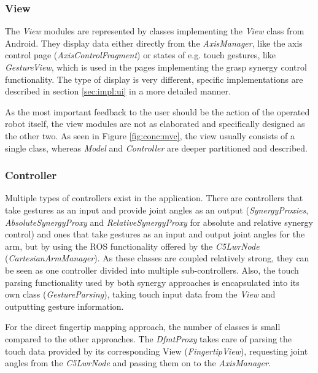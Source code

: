 \subsubsection{View}

The \textit{View} modules are represented by classes implementing the \textit{View} class from Android. They display data either directly from the \textit{AxisManager}, like the axis control page (\textit{AxisControlFragment}) or states of e.g. touch gestures, like \textit{GestureView}, which is used in the pages implementing the grasp synergy control functionality. The type of display is very different, specific implementations are described in section \ref{sec:impl:ui} in a more detailed manner.

As the most important feedback to the user should be the action of the operated robot itself, the view modules are not as elaborated and specifically designed as the other two. As seen in Figure \ref{fig:conc:mvc}, the view usually consists of a single class, whereas \textit{Model} and \textit{Controller} are deeper partitioned and described.

\subsubsection{Controller}

Multiple types of controllers exist in the application. There are controllers that take gestures as an input and provide joint angles as an output (\textit{SynergyProxies}, \textit{AbsoluteSynergyProxy} and \textit{RelativeSynergyProxy} for absolute and relative synergy control) and ones that take gestures as an input and output joint angles for the arm, but by using the ROS functionality offered by the \textit{C5LwrNode} (\textit{CartesianArmManager}). As these classes are coupled relatively strong, they can be seen as one controller divided into multiple sub-controllers. Also, the touch parsing functionality used by both synergy approaches is encapsulated into its own class (\textit{GestureParsing}), taking touch input data from the \textit{View} and outputting gesture information.

For the direct fingertip mapping approach, the number of classes is small compared to the other approaches. The \textit{DfmtProxy} takes care of parsing the touch data provided by its corresponding View (\textit{FingertipView}), requesting joint angles from the \textit{C5LwrNode} and passing them on to the \textit{AxisManager}.

